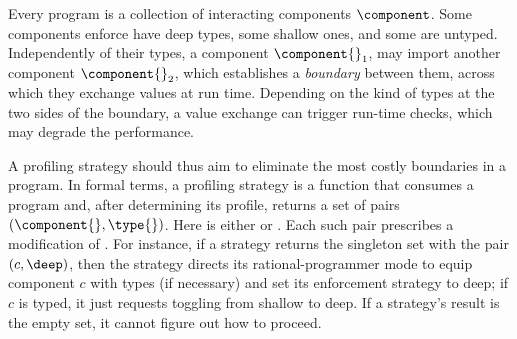 Every program \program{} is a collection of interacting components $\component$.
Some components enforce have deep types, some shallow ones, and some
are untyped. Independently of their types, a component $\component{}_1$, may
import another component $\component{}_2$, which establishes a \emph{boundary}
between them, across which they exchange values at run time. Depending on the
kind of types at the two sides of the boundary, a value exchange can trigger
run-time checks, which may degrade the performance.

A profiling strategy should thus aim to eliminate the most costly boundaries in
a program. In formal terms, a profiling strategy is a function that consumes a
program \program{} and, after determining its profile, returns a set of pairs
$(\component{}, \type{})$. Here \type{} is either \deep{} or \shallow{}. Each
such pair prescribes a modification of \program{}. For instance, if a strategy
returns the singleton set with the pair $(c, \deep)$, then the strategy directs
its rational-programmer mode to equip component $c$ with types (if necessary)
and set its enforcement strategy to deep; if $c$ is typed, it just requests
toggling from shallow to deep.  If a strategy's result is the empty set, it
cannot figure out how to proceed.


\def\with{with {\em total\/} in place of {\em self\/}}

